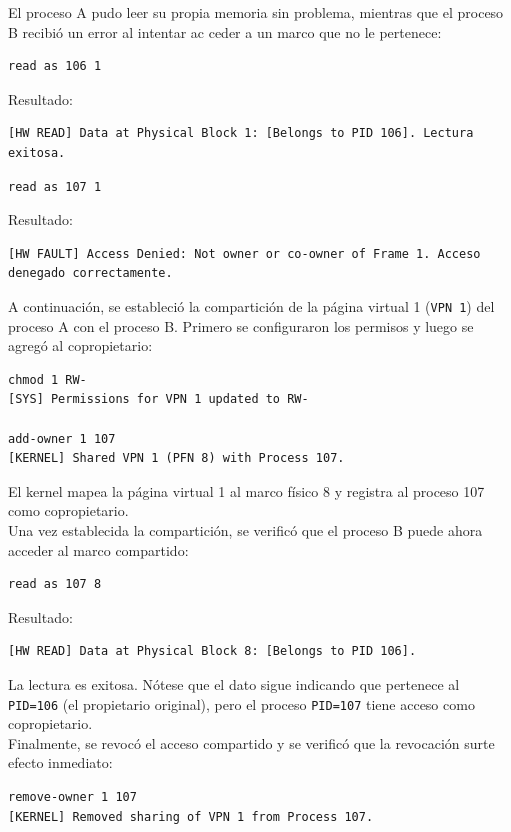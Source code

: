 \documentclass[12pt,letterpaper]{article}
\begin{document}
El proceso A pudo leer su propia memoria sin problema, mientras que el proceso B recibió un error al intentar ac
ceder a un marco que no le pertenece:
\begin{Verbatim}[formatcom=\color{greencolor}]
read as 106 1
\end{Verbatim}
Resultado:
\begin{Verbatim}[formatcom=\color{redcolor}]
[HW READ] Data at Physical Block 1: [Belongs to PID 106]. Lectura exitosa.
\end{Verbatim}

\begin{Verbatim}[formatcom=\color{greencolor}]
read as 107 1
\end{Verbatim}
Resultado:
\begin{Verbatim}[formatcom=\color{redcolor}]
[HW FAULT] Access Denied: Not owner or co-owner of Frame 1. Acceso denegado correctamente.
\end{Verbatim}

A continuación, se estableció la compartición de la página virtual 1 (\texttt{VPN 1}) del proceso A con el
proceso B. Primero se configuraron los permisos y luego se agregó al copropietario:
\begin{Verbatim}[formatcom=\color{greencolor}]
chmod 1 RW-
[SYS] Permissions for VPN 1 updated to RW-

add-owner 1 107
[KERNEL] Shared VPN 1 (PFN 8) with Process 107.
\end{Verbatim}
El kernel mapea la página virtual 1 al marco físico 8 y registra al proceso 107 como copropietario.\\

Una vez establecida la compartición, se verificó que el proceso B puede ahora acceder al marco compartido:
\begin{Verbatim}[formatcom=\color{greencolor}]
read as 107 8
\end{Verbatim}
Resultado:
\begin{Verbatim}[formatcom=\color{greeblucolor}]
[HW READ] Data at Physical Block 8: [Belongs to PID 106].
\end{Verbatim}
La lectura es exitosa. Nótese que el dato sigue indicando que pertenece al \texttt{PID=106} (el propietario
original), pero el proceso \texttt{PID=107} tiene acceso como copropietario.\\

Finalmente, se revocó el acceso compartido y se verificó que la revocación surte efecto inmediato:
\begin{Verbatim}[formatcom=\color{greencolor}]
remove-owner 1 107
[KERNEL] Removed sharing of VPN 1 from Process 107.
\end{Verbatim}
\end{document}
